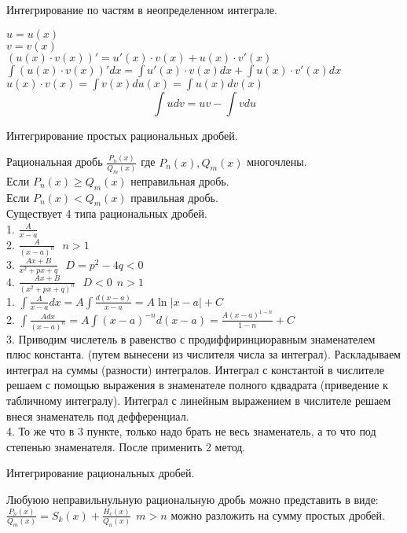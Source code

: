 \begin{title}[\Large]
  Интегрирование по частям в неопределенном интеграле.
\end{title}
$u = u(x)$\\
$v = v(x)$\\
$(u(x)\cdot v(x))' = u'(x)\cdot v(x) + u(x)\cdot v'(x)$\\
$\int(u(x)\cdot v(x))'dx = \int u'(x)\cdot v(x)dx + \int u(x)\cdot v'(x)dx$\\
$u(x)\cdot v(x) = \int v(x)du(x) = \int u(x)dv(x)$\\
\[\int udv = uv - \int vdu\]

\begin{title}[\Large]
  Интегрирование простых рациональных дробей.
\end{title}
Рациональная дробь $\frac{P_n(x)}{Q_m(x)}$ где $P_n(x), Q_m(x)$ многочлены.\\
Если $P_n(x) \ge Q_m(x)$ неправильная дробь.\\
Если $P_n(x) < Q_m(x)$ правильная дробь.\\

Существует 4 типа рациональных дробей.\\
1. $\frac{A}{x-a}$\\
2. $\frac{A}{(x-a)^n} ~~~ n > 1$\\
3. $\frac{Ax + B}{x^2 + px +q} ~~~ D = p^2 - 4q < 0$\\
4. $\frac{Ax + B}{(x^2 + px +q)^n} ~~~ D < 0 ~~ n > 1$\\

1. $\int \frac{A}{x-a}dx = A\int \frac{d(x-a)}{x-a} = A\ln|x-a| + C$\\
2. $\int \frac{Adx}{(x-a)^n} = A\int (x-a)^{-n}d(x-a)
  = \frac{A(x-a)^{1-n}}{1-n} + C$\\
3. Приводим числетель в равенство с продиффиринциоравным знаменателем плюс
  константа. (путем вынесени из числителя числа за интеграл).
  Раскладываем интеграл на суммы (разности) интегралов. Интеграл с константой
  в числителе решаем с помощью выражения в знаменателе полного кдвадрата
  (приведение к табличному интегралу). Интеграл с линейным выражением
  в числителе решаем внеся знаменатель под дефференциал.\\
4. То же что в 3 пункте, только надо брать не весь знаменатель, а то что под
  степенью знаменателя. После применить 2 метод.\\

\begin{title}[\Large]
  Интегрирование рациональных дробей.
\end{title}
Любуюю неправильнульную рациональную дробь можно представить в виде:\\
$\frac{P_n(x)}{Q_m(x)} = S_k(x) + \frac{H_c(x)}{Q_n(x)} ~~ m>n$ можно разложить
на сумму простых дробей.\\